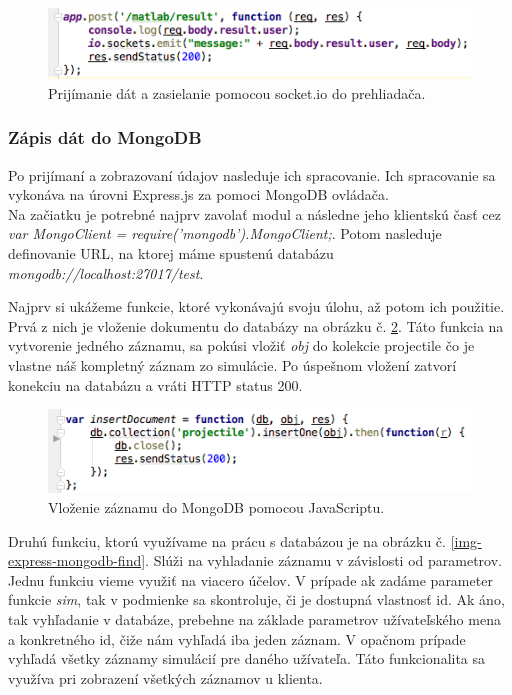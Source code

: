 \begin{figure}[H]
  \centering
  \includegraphics[scale=0.7]{img/code/express-socketio.png}
  \caption{Prijímanie dát a zasielanie pomocou socket.io do prehliadača.}
  \label{img-express-socketio}
\end{figure}

\subsubsection{Zápis dát do MongoDB}
Po prijímaní a zobrazovaní údajov nasleduje ich spracovanie. Ich spracovanie sa vykonáva na úrovni Express.js za pomoci MongoDB ovládača.\\
Na začiatku je potrebné najprv zavolať modul a následne jeho klientskú časť cez \textit{var MongoClient = require('mongodb').MongoClient;}. Potom nasleduje definovanie URL, na ktorej máme spustenú databázu \textit{mongodb://localhost:27017/test}.

Najprv si ukážeme funkcie, ktoré vykonávajú svoju úlohu, až potom ich použitie. Prvá z nich je vloženie dokumentu do databázy na obrázku č. \ref{img-express-mongo-insert}. Táto funkcia na vytvorenie jedného záznamu, sa pokúsi vložiť \textit{obj} do kolekcie projectile čo je vlastne náš kompletný záznam zo simulácie. Po úspešnom vložení zatvorí konekciu na databázu a vráti HTTP status 200.

\begin{figure}[H]
  \centering
  \includegraphics[scale=0.7]{img/code/express-mongo-insert.png}
  \caption{Vloženie záznamu do MongoDB pomocou JavaScriptu.}
  \label{img-express-mongo-insert}
\end{figure}

Druhú funkciu, ktorú využívame na prácu s databázou je na obrázku č. \ref{img-express-mongodb-find}. Slúži na vyhladanie záznamu v závislosti od parametrov. Jednu funkciu vieme využiť na viacero účelov. V prípade ak zadáme parameter funkcie \textit{sim}, tak v podmienke sa skontroluje, či je dostupná vlastnosť id. Ak áno, tak vyhľadanie v databáze, prebehne na základe parametrov užívateľského mena a konkretného id, čiže nám vyhľadá iba jeden záznam. V opačnom prípade vyhľadá všetky záznamy simulácií pre daného užívateľa. Táto funkcionalita sa využíva pri zobrazení všetkých záznamov u klienta.

